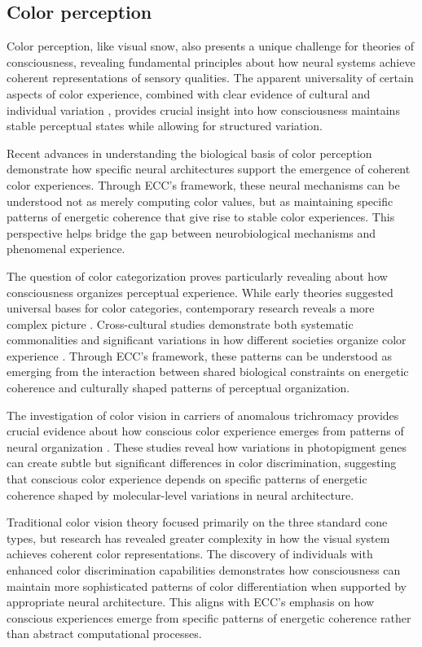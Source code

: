 \begin{refsection}
\section{Color perception}

Color perception, like visual snow, also presents a unique challenge for theories of consciousness, revealing fundamental principles about how neural systems achieve coherent representations of sensory qualities. The apparent universality of certain aspects of color experience, combined with clear evidence of cultural and individual variation \cite{Davidoff2015}, provides crucial insight into how consciousness maintains stable perceptual states while allowing for structured variation.

Recent advances in understanding the biological basis of color perception \cite{ConwayLivingstone2021} demonstrate how specific neural architectures support the emergence of coherent color experiences. Through ECC's framework, these neural mechanisms can be understood not as merely computing color values, but as maintaining specific patterns of energetic coherence that give rise to stable color experiences. This perspective helps bridge the gap between neurobiological mechanisms and phenomenal experience.

The question of color categorization proves particularly revealing about how consciousness organizes perceptual experience. While early theories suggested universal bases for color categories, contemporary research reveals a more complex picture \cite{KayRegier2003}. Cross-cultural studies demonstrate both systematic commonalities and significant variations in how different societies organize color experience \cite{MacLaury1997}. Through ECC's framework, these patterns can be understood as emerging from the interaction between shared biological constraints on energetic coherence and culturally shaped patterns of perceptual organization.

The investigation of color vision in carriers of anomalous trichromacy provides crucial evidence about how conscious color experience emerges from patterns of neural organization \cite{JordanMollon1993}. These studies reveal how variations in photopigment genes can create subtle but significant differences in color discrimination, suggesting that conscious color experience depends on specific patterns of energetic coherence shaped by molecular-level variations in neural architecture.

Traditional color vision theory focused primarily on the three standard cone types, but research has revealed greater complexity in how the visual system achieves coherent color representations. The discovery of individuals with enhanced color discrimination capabilities \cite{Jameson2001} demonstrates how consciousness can maintain more sophisticated patterns of color differentiation when supported by appropriate neural architecture. This aligns with ECC's emphasis on how conscious experiences emerge from specific patterns of energetic coherence rather than abstract computational processes.


\end{refsection}
